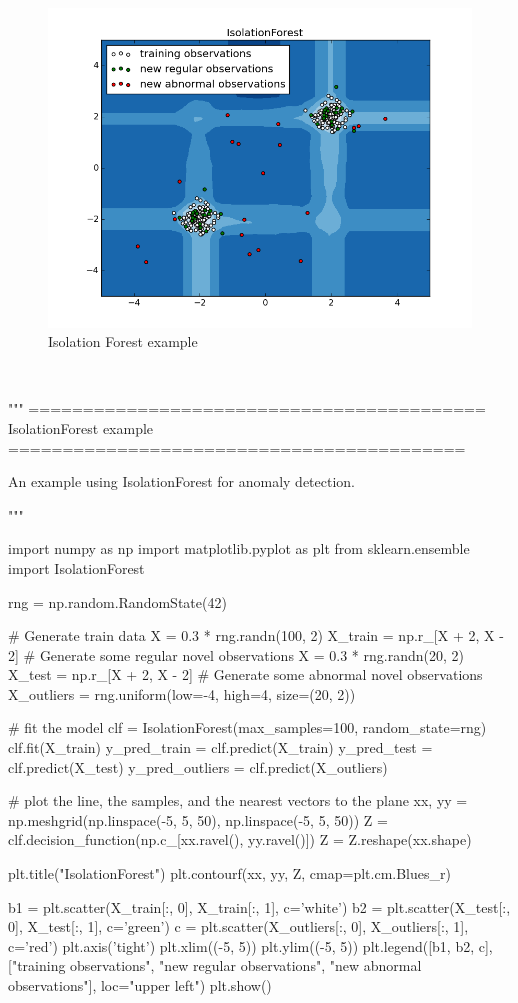 \begin{figure}[!h]
\centering
  \includegraphics[width=0.8\linewidth]{fig_source/iforest}
  \caption{Isolation Forest example}
  \label{fig:iforest}
\end{figure}
~\\
\begin{pythoncode} 
"""
==========================================
IsolationForest example
==========================================

An example using IsolationForest for anomaly detection.

"""

import numpy as np
import matplotlib.pyplot as plt
from sklearn.ensemble import IsolationForest

rng = np.random.RandomState(42)

# Generate train data
X = 0.3 * rng.randn(100, 2)
X_train = np.r_[X + 2, X - 2]
# Generate some regular novel observations
X = 0.3 * rng.randn(20, 2)
X_test = np.r_[X + 2, X - 2]
# Generate some abnormal novel observations
X_outliers = rng.uniform(low=-4, high=4, size=(20, 2))

# fit the model
clf = IsolationForest(max_samples=100, random_state=rng)
clf.fit(X_train)
y_pred_train = clf.predict(X_train)
y_pred_test = clf.predict(X_test)
y_pred_outliers = clf.predict(X_outliers)

# plot the line, the samples, and the nearest vectors to the plane
xx, yy = np.meshgrid(np.linspace(-5, 5, 50), np.linspace(-5, 5, 50))
Z = clf.decision_function(np.c_[xx.ravel(), yy.ravel()])
Z = Z.reshape(xx.shape)

plt.title("IsolationForest")
plt.contourf(xx, yy, Z, cmap=plt.cm.Blues_r)

b1 = plt.scatter(X_train[:, 0], X_train[:, 1], c='white')
b2 = plt.scatter(X_test[:, 0], X_test[:, 1], c='green')
c = plt.scatter(X_outliers[:, 0], X_outliers[:, 1], c='red')
plt.axis('tight')
plt.xlim((-5, 5))
plt.ylim((-5, 5))
plt.legend([b1, b2, c],
           ["training observations",
            "new regular observations", "new abnormal observations"],
           loc="upper left")
plt.show()
\end{pythoncode}


